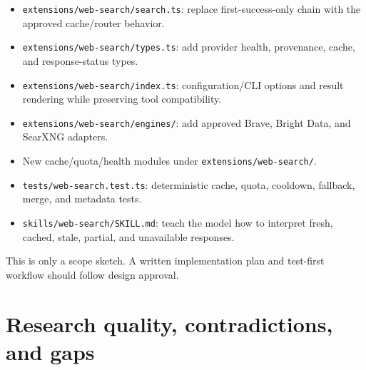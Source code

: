 \documentclass[11pt]{article}
\begin{document}
\begin{itemize}
\item \texttt{extensions/web-search/search.ts}: replace first-success-only chain with the
approved cache/router behavior.
\item \texttt{extensions/web-search/types.ts}: add provider health, provenance, cache, and
response-status types.
\item \texttt{extensions/web-search/index.ts}: configuration/CLI options and result
rendering while preserving tool compatibility.
\item \texttt{extensions/web-search/engines/}: add approved Brave, Bright Data, and SearXNG
adapters.
\item New cache/quota/health modules under \texttt{extensions/web-search/}.
\item \texttt{tests/web-search.test.ts}: deterministic cache, quota, cooldown, fallback,
merge, and metadata tests.
\item \texttt{skills/web-search/SKILL.md}: teach the model how to interpret fresh, cached,
stale, partial, and unavailable responses.
\end{itemize}

This is only a scope sketch.  A written implementation plan and test-first
workflow should follow design approval.
\section*{Research quality, contradictions, and gaps}
\label{sec:orgaf8e80d}
\end{document}
